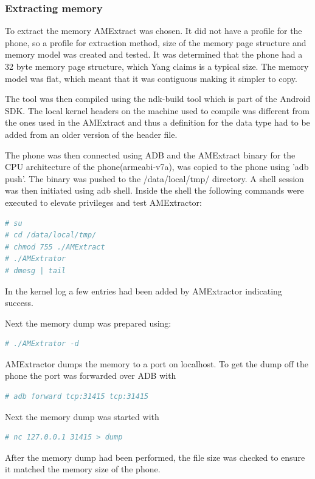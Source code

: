 


\subsubsection{Extracting memory}
To extract the memory AMExtract\cite{yang2016tool} was chosen.
 It did not have a profile for the phone, so a profile for extraction method, size of the memory page structure and memory model was created and tested. It was determined that the phone had a 32 byte memory page structure, which Yang\cite{yang2016tool} claims is a typical size. The memory model was flat, which meant that it was contiguous making it simpler to copy.
 
 The tool was then compiled using the ndk-build tool which is part of the Android SDK. The local kernel headers on the machine used to compile was different from the ones used in the AMExtract and thus a definition for the data type had to be added from an older version of the header file.
 
 The phone was then connected using ADB and the AMExtract binary for the CPU architecture of the phone(armeabi-v7a), was copied to the phone using 'adb push'. The binary was pushed to the /data/local/tmp/ directory. A shell session was then initiated using adb shell. Inside the shell the following commands were executed to elevate privileges and test AMExtractor:
 \begin{lstlisting}[language=bash]
# su
# cd /data/local/tmp/
# chmod 755 ./AMExtract
# ./AMExtrator
# dmesg | tail
 \end{lstlisting}
 In the kernel log a few entries had been added by AMExtractor indicating success.
 
 Next the memory dump was prepared using:
  \begin{lstlisting}[language=bash]
# ./AMExtrator -d
 \end{lstlisting}
 
AMExtractor dumps the memory to a port on localhost. To get the dump off the phone the port was forwarded over ADB with 
 \begin{lstlisting}[language=bash]
# adb forward tcp:31415 tcp:31415
 \end{lstlisting}
Next the memory dump was started with
 \begin{lstlisting}[language=bash]
# nc 127.0.0.1 31415 > dump
  \end{lstlisting}

After the memory dump had been performed, the file size was checked to ensure it matched the memory size of the phone.

